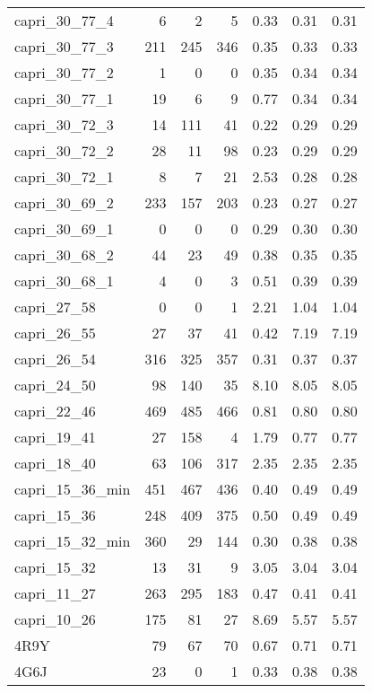 \begin{table}[h]
\begin{center}
\begin{tabular}{ l | r | r | r | c | c | c }
       capri\_30\_77\_4 & 6 & 2 & 5 & 0.33 & 0.31 & 0.31 \\
       capri\_30\_77\_3 & 211 & 245 & 346 & 0.35 & 0.33 & 0.33 \\
       capri\_30\_77\_2 & 1 & 0 & 0 & 0.35 & 0.34 & 0.34 \\
       capri\_30\_77\_1 & 19 & 6 & 9 & 0.77 & 0.34 & 0.34 \\
       capri\_30\_72\_3 & 14 & 111 & 41 & 0.22 & 0.29 & 0.29 \\
       capri\_30\_72\_2 & 28 & 11 & 98 & 0.23 & 0.29 & 0.29 \\
       capri\_30\_72\_1 & 8 & 7 & 21 & 2.53 & 0.28 & 0.28 \\
       capri\_30\_69\_2 & 233 & 157 & 203 & 0.23 & 0.27 & 0.27 \\
       capri\_30\_69\_1 & 0 & 0 & 0 & 0.29 & 0.30 & 0.30 \\
       capri\_30\_68\_2 & 44 & 23 & 49 & 0.38 & 0.35 & 0.35 \\
       capri\_30\_68\_1 & 4 & 0 & 3 & 0.51 & 0.39 & 0.39 \\
       capri\_27\_58 & 0 & 0 & 1 & 2.21 & 1.04 & 1.04 \\
       capri\_26\_55 & 27 & 37 & 41 & 0.42 & 7.19 & 7.19 \\
       capri\_26\_54 & 316 & 325 & 357 & 0.31 & 0.37 & 0.37 \\
       capri\_24\_50 & 98 & 140 & 35 & 8.10 & 8.05 & 8.05 \\
       capri\_22\_46 & 469 & 485 & 466 & 0.81 & 0.80 & 0.80 \\
       capri\_19\_41 & 27 & 158 & 4 & 1.79 & 0.77 & 0.77 \\
       capri\_18\_40 & 63 & 106 & 317 & 2.35 & 2.35 & 2.35 \\
       capri\_15\_36\_min & 451 & 467 & 436 & 0.40 & 0.49 & 0.49 \\
       capri\_15\_36 & 248 & 409 & 375 & 0.50 & 0.49 & 0.49 \\
       capri\_15\_32\_min & 360 & 29 & 144 & 0.30 & 0.38 & 0.38 \\
       capri\_15\_32 & 13 & 31 & 9 & 3.05 & 3.04 & 3.04 \\
       capri\_11\_27 & 263 & 295 & 183 & 0.47 & 0.41 & 0.41 \\
       capri\_10\_26 & 175 & 81 & 27 & 8.69 & 5.57 & 5.57 \\
       4R9Y & 79 & 67 & 70 & 0.67 & 0.71 & 0.71 \\
       4G6J & 23 & 0 & 1 & 0.33 & 0.38 & 0.38 \\

\end{tabular}
\end{center}
\end{table}
